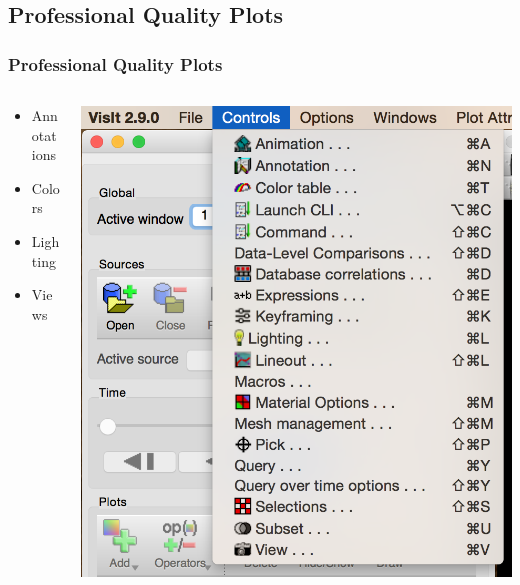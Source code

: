 
\subsection{Professional Quality Plots}
\begin{frame}
\frametitle{Professional Quality Plots}
\begin{columns}
\begin{column}{4cm}
\begin{itemize}
	\item Annotations
	\item Colors
	\item Lighting
	\item Views
\end{itemize}
\end{column}
\begin{column}{6cm}
	\includegraphics[width=\columnwidth]{figs/visit-guis/visit_ctrls}
\end{column}
\end{columns}
\end{frame}

